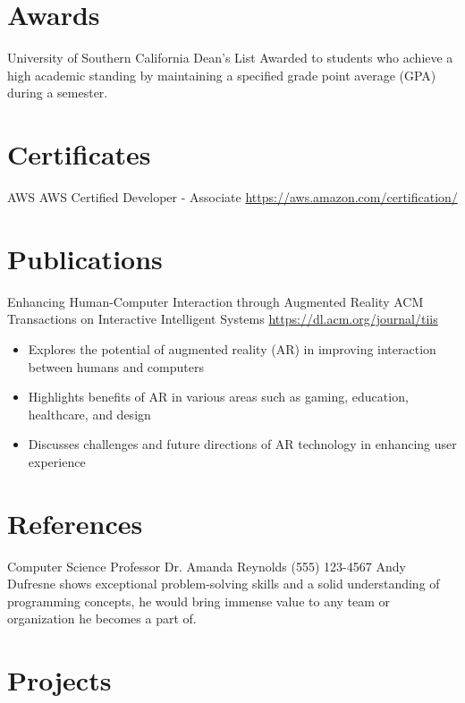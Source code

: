 \documentclass[a4paper, serif, 10pt]{moderncv}
\begin{document}
\section{Awards}

        {University of Southern California}
        {Dean's List}
        {}
        {}
        {Awarded to students who achieve a high academic standing by maintaining
a specified grade point average (GPA) during a semester.}
\section{Certificates}

        {AWS}
        {AWS Certified Developer - Associate}
        {\url{https://aws.amazon.com/certification/}}
        {}
        {}
\section{Publications}

        {Enhancing Human-Computer Interaction through Augmented Reality}
        {ACM Transactions on Interactive Intelligent Systems}
        {\url{https://dl.acm.org/journal/tiis}}
        {}
        {\begin{itemize}
\item Explores the potential of augmented reality (AR) in improving interaction between humans and computers
\item Highlights benefits of AR in various areas such as gaming, education, healthcare, and design
\item Discusses challenges and future directions of AR technology in enhancing user experience
\end{itemize}}
\section{References}

        {Computer Science Professor}
        {Dr. Amanda Reynolds}
        {(555) 123-4567}
        {}
        {Andy Dufresne shows exceptional problem-solving skills and a solid
understanding of programming concepts, he would bring immense value to
any team or organization he becomes a part of.}
\section{Projects}
\end{document}
